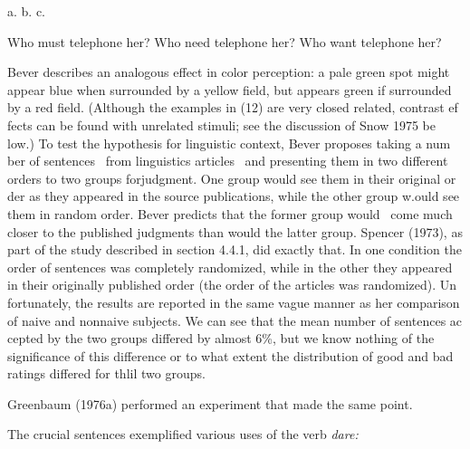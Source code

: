 \begin{multicols}{2}
\begin{listWWNumxxviiileveli}
\item 
\begin{styleStandard}
a. b. c.
\end{styleStandard}


\end{listWWNumxxviiileveli}
\begin{styleStandard}
Who must telephone her? Who need telephone her? Who want telephone her?
\end{styleStandard}


\end{multicols}
\begin{styleStandard}
Bever describes an analogous effect in color perception: a pale green spot might appear blue when surrounded by a yellow field, but appears green if surrounded by a red field. (Although the examples in (12) are very closed related, contrast ef\- fects can be found with unrelated stimuli; see the discussion of Snow 1975 be\- low.) To test the hypothesis for linguistic context, Bever proposes taking a num\- ber of sentences \ from linguistics articles \ and presenting them in two different orders to two groups forjudgment. One group would see them in their original or\- der as they appeared in the source publications, while the other group w.ould see them in random order. Bever predicts that the former group would \ come much closer to the published judgments than would the latter group. Spencer (1973), as part of the study described in section 4.4.1, did exactly that. In one condition the order of sentences was completely randomized, while in the other they appeared in their originally published order (the order of the articles was randomized). Un\- fortunately, the results are reported in the same vague manner as her comparison of naive and nonnaive subjects. We can see that the mean number of sentences ac\- cepted by the two groups differed by almost 6\%, but we know nothing of the significance of this difference or to what extent the distribution of good and bad ratings differed for thlil two groups.
\end{styleStandard}


\begin{styleStandard}
Greenbaum (1976a) performed an experiment that made the same point.
\end{styleStandard}


\begin{styleStandard}
The crucial sentences exemplified various uses of the verb \textit{dare:}
\end{styleStandard}


